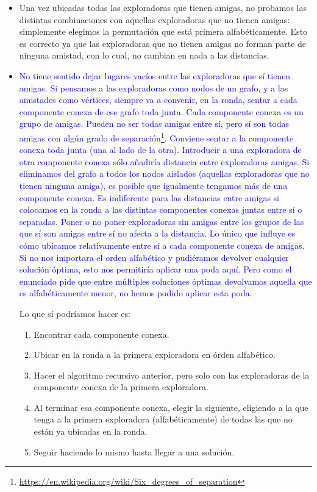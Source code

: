 \begin{itemize}
 \item Una vez ubicadas todas las exploradoras que tienen amigas, no probamos las distintas combinaciones con aquellas exploradoras que no tienen amigas: simplemente elegimos la permutación que está primera alfabéticamente. Esto es correcto ya que las exploradoras que no tienen amigas no forman parte de ninguna amistad, con lo cual, no cambian en nada a las distancias.
 \item \textcolor{blue}{No tiene sentido dejar lugares vacíos entre las exploradoras que sí tienen amigas. Si pensamos a las exploradoras como nodos de un grafo, y a las amistades como vértices, siempre va a convenir, en la ronda, sentar a cada componente conexa de ese grafo toda junta. Cada componente conexa es un grupo de amigas. Pueden no ser todas amigas entre sí, pero sí son todas amigas con algún grado de separación\footnote{\url{https://en.wikipedia.org/wiki/Six_degrees_of_separation}}. Conviene sentar a la componente conexa toda junta (una al lado de la otra). Introducir a una exploradora de otra componente conexa sólo añadiría distancia entre exploradoras amigas. Si eliminamos del grafo a todos los nodos aislados (aquellas exploradoras que no tienen ninguna amiga), es posible que igualmente tengamos más de una componente conexa. Es indiferente para las distancias entre amigas si colocamos en la ronda a las distintas componentes conexas juntas entre sí o separadas. Poner o no poner exploradoras sin amigas entre los grupos de las que sí son amigas entre sí no afecta a la distancia. Lo único que influye es cómo ubicamos relativamente entre sí a cada componente conexa de amigas. Si no nos importara el orden alfabético y pudiéramos devolver cualquier solución óptima, esto nos permitiría aplicar una poda aquí. Pero como el enunciado pide que entre múltiples soluciones óptimas devolvamos aquella que es alfabéticamente menor, no hemos podido aplicar esta poda.}
 
 Lo que sí podríamos hacer es:
 \begin{enumerate}
  \item Encontrar cada componente conexa.
  \item Ubicar en la ronda a la primera exploradora en órden alfabético.
  \item Hacer el algoritmo recursivo anterior, pero solo con las exploradoras de la componente conexa de la primera exploradora.
  \item Al terminar esa componente conexa, elegir la siguiente, eligiendo a la que tenga a la primera exploradora (alfabéticamente) de todas las que no están ya ubicadas en la ronda.
  \item Seguir haciendo lo mismo hasta llegar a una solución.
 \end{enumerate}

\end{itemize}

